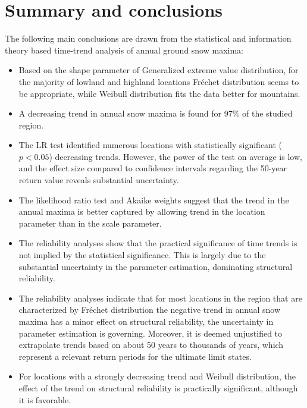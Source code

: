 \section{Summary and conclusions}

The following main conclusions are drawn from the statistical and information theory based time-trend analysis of annual ground snow maxima:
\begin{itemize}
	\item Based on the shape parameter of Generalized extreme value distribution, for the majority of lowland and highland locations Fréchet distribution seems to be appropriate, while Weibull distribution fits the data better for mountains.
	\item A decreasing trend in annual snow maxima is found for 97\% of the studied region.
	\item The LR test identified numerous locations with statistically significant ($p < 0.05$) decreasing trends. However, the power of the test on average is low, and the effect size compared to confidence intervals regarding the 50-year return value reveals substantial uncertainty.
	\item The likelihood ratio test and Akaike weights suggest that the trend in the annual maxima is better captured by allowing trend in the location parameter than in the scale parameter.
	\item The reliability analyses show that the practical significance of time trends is not implied by the statistical significance. This is largely due to the substantial uncertainty in the parameter estimation, dominating structural reliability.
	\item The reliability analyses indicate that for most locations in the region that are characterized by 
	Fréchet distribution the negative trend in annual snow maxima has a minor effect on structural reliability, the uncertainty in parameter estimation is governing. Moreover, it is deemed unjustified to extrapolate trends based on about 50 years to thousands of years, which represent a relevant return periods for the ultimate limit states.
	\item For locations with a strongly decreasing trend and Weibull distribution, the effect of the trend on structural reliability is practically significant, although it is favorable. 
\end{itemize}


